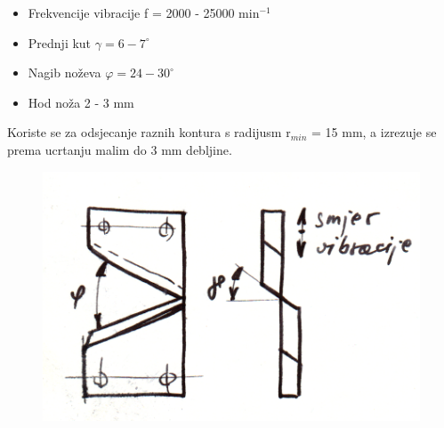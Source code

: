 \documentclass[a4paper,12pt]{article}
\numberwithin{figure}{section}
\begin{document}
\begin{enumerate}
\begin{itemize}
\item Frekvencije vibracije f = 2000 - 25000 min$^{-1}$
\item Prednji kut $\gamma = 6 -7^{\circ}$
\item Nagib noževa $\varphi = 24 - 30 ^{\circ}$
\item Hod noža 2 - 3 mm
\end{itemize}
Koriste se za odsjecanje raznih kontura s radijusm r$_{min}$ = 15 mm, a izrezuje se prema ucrtanju malim do 3 mm debljine.
\begin{figure}[!h]
\centering
\includegraphics[scale=0.2]{image_55-3.png}
\end{figure}
\FloatBarrier
\end{enumerate}
\end{document}
